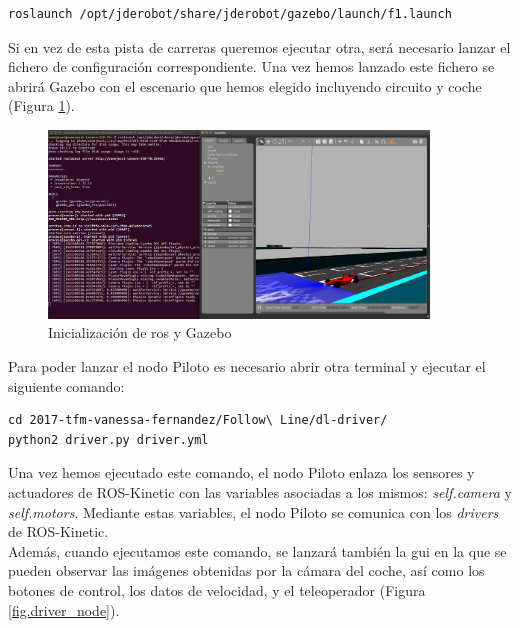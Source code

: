 \vspace{10pt}
\begin{lstlisting}
roslaunch /opt/jderobot/share/jderobot/gazebo/launch/f1.launch
\end{lstlisting}
\vspace{20pt}

Si en vez de esta pista de carreras queremos ejecutar otra, será necesario lanzar el fichero de configuración correspondiente. Una vez hemos lanzado este fichero se abrirá Gazebo con el escenario que hemos elegido incluyendo circuito y coche (Figura \ref{fig.roslaunch}).\\

\begin{figure}
  \begin{center}
    \includegraphics[width=0.9\textwidth]{figures/Infraestructura/roslaunch.png}
		\caption{Inicialización de \acrshort{ros} y Gazebo}
		\label{fig.roslaunch}
		\end{center}
\end{figure}

Para poder lanzar el nodo Piloto es necesario abrir otra terminal y ejecutar el siguiente comando:\\

\vspace{10pt}
\begin{lstlisting}
cd 2017-tfm-vanessa-fernandez/Follow\ Line/dl-driver/
python2 driver.py driver.yml
\end{lstlisting}
\vspace{20pt}

Una vez hemos ejecutado este comando, el nodo Piloto enlaza los sensores y actuadores de ROS-Kinetic con las variables asociadas a los mismos: \textit{self.camera} y \textit{self.motors}. Mediante estas variables, el nodo Piloto se comunica con los \textit{drivers} de ROS-Kinetic.\\

Además, cuando ejecutamos este comando, se lanzará también la \acrfull{gui} en la que se pueden observar las imágenes obtenidas por la cámara del coche, así como los botones de control, los datos de velocidad, y el teleoperador (Figura \ref{fig.driver_node}).\\

